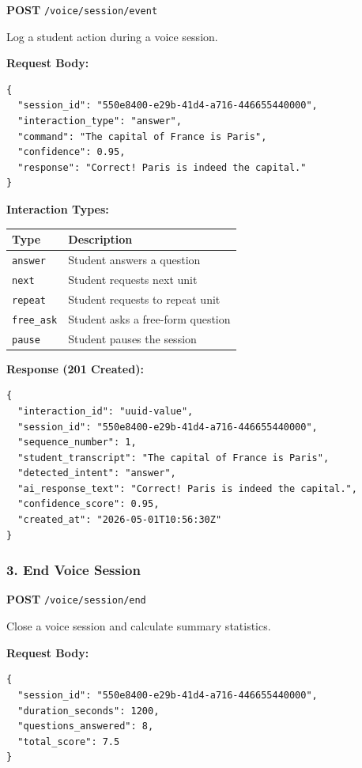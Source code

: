 \documentclass[12pt,a4paper,oneside]{article}
\begin{document}
\textbf{POST} \texttt{/voice/session/event}

Log a student action during a voice session.

\textbf{Request Body:}
\begin{lstlisting}
{
  "session_id": "550e8400-e29b-41d4-a716-446655440000",
  "interaction_type": "answer",
  "command": "The capital of France is Paris",
  "confidence": 0.95,
  "response": "Correct! Paris is indeed the capital."
}
\end{lstlisting}

\textbf{Interaction Types:}
\begin{table}[H]
\centering
\begin{tabular}{|l|l|}
\hline
\textbf{Type} & \textbf{Description} \\
\hline
\texttt{answer} & Student answers a question \\
\texttt{next} & Student requests next unit \\
\texttt{repeat} & Student requests to repeat unit \\
\texttt{free\_ask} & Student asks a free-form question \\
\texttt{pause} & Student pauses the session \\
\hline
\end{tabular}
\end{table}

\textbf{Response (201 Created):}
\begin{lstlisting}
{
  "interaction_id": "uuid-value",
  "session_id": "550e8400-e29b-41d4-a716-446655440000",
  "sequence_number": 1,
  "student_transcript": "The capital of France is Paris",
  "detected_intent": "answer",
  "ai_response_text": "Correct! Paris is indeed the capital.",
  "confidence_score": 0.95,
  "created_at": "2026-05-01T10:56:30Z"
}
\end{lstlisting}

\subsubsection{3. End Voice Session}

\textbf{POST} \texttt{/voice/session/end}

Close a voice session and calculate summary statistics.

\textbf{Request Body:}
\begin{lstlisting}
{
  "session_id": "550e8400-e29b-41d4-a716-446655440000",
  "duration_seconds": 1200,
  "questions_answered": 8,
  "total_score": 7.5
}
\end{lstlisting}
\end{document}
